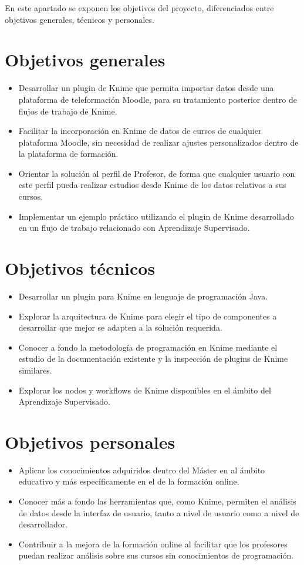 En este apartado se exponen los objetivos del proyecto, diferenciados entre objetivos generales, técnicos y personales. 

\section{Objetivos generales}

\begin{itemize}
	\item Desarrollar un plugin de Knime que permita importar datos desde una plataforma 
	de teleformación Moodle, para su tratamiento posterior dentro de flujos de trabajo de Knime.
	\item Facilitar la incorporación en Knime de datos de cursos de cualquier plataforma Moodle, 
	sin necesidad de realizar ajustes personalizados dentro de la plataforma de formación. 
    \item Orientar la solución al perfil de Profesor, de forma que cualquier usuario con este
	 perfil pueda realizar estudios desde Knime de los datos relativos a sus cursos. 
    \item Implementar un ejemplo práctico utilizando el plugin de Knime desarrollado en un
	 flujo de trabajo relacionado con Aprendizaje Supervisado.
\end{itemize}

\section{Objetivos técnicos}

\begin{itemize}
	\item Desarrollar un plugin para Knime en lenguaje de programación Java. 
	\item Explorar la arquitectura de Knime para elegir el tipo de componentes a desarrollar que mejor se adapten a la solución requerida.
	\item Conocer a fondo la metodología de programación en Knime mediante el estudio de la documentación existente y la inspección de plugins de Knime similares.
	\item Explorar los nodos y workflows de Knime disponibles en el ámbito del Aprendizaje Supervisado.
\end{itemize}

\section{Objetivos personales}

\begin{itemize}
	\item Aplicar los conocimientos adquiridos dentro del Máster en al ámbito educativo y más específicamente en el de la formación online. 
	\item Conocer más a fondo las herramientas que, como Knime, permiten el análisis de datos desde la interfaz de usuario, tanto a nivel de usuario como a nivel de desarrollador. 
    \item Contribuir a la mejora de la formación online al facilitar que los profesores puedan realizar análisis sobre sus cursos sin conocimientos de programación. 
\end{itemize}
